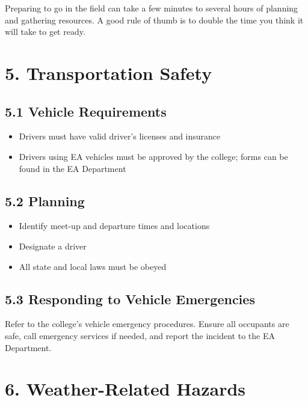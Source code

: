 \documentclass[
  11pt,
  letterpaper,
]{article}
\providecommand{\tightlist}{%
  \setlength{\itemsep}{0pt}\setlength{\parskip}{0pt}}
\begin{document}
Preparing to go in the field can take a few minutes to several hours of
planning and gathering resources. A good rule of thumb is to double the
time you think it will take to get ready.

\section{5. Transportation Safety}\label{transportation-safety}

\subsection{5.1 Vehicle Requirements}\label{vehicle-requirements}

\begin{itemize}
\tightlist
\item
  Drivers must have valid driver's licenses and insurance
\item
  Drivers using EA vehicles must be approved by the college; forms can
  be found in the EA Department
\end{itemize}

\subsection{5.2 Planning}\label{planning}

\begin{itemize}
\tightlist
\item
  Identify meet-up and departure times and locations
\item
  Designate a driver
\item
  All state and local laws must be obeyed
\end{itemize}

\subsection{5.3 Responding to Vehicle
Emergencies}\label{responding-to-vehicle-emergencies}

Refer to the college's vehicle emergency procedures. Ensure all
occupants are safe, call emergency services if needed, and report the
incident to the EA Department.

\section{6. Weather-Related Hazards}\label{weather-related-hazards}
\end{document}

